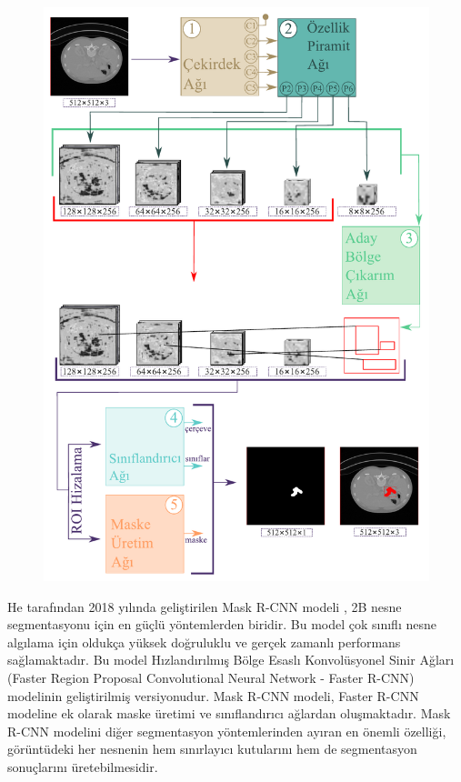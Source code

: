 \begin{figure}[h!]
	\begin{center}
		\vspace{0.4cm}
		{
			\vspace{0.4cm}
			\includegraphics[scale=0.8]{Yapilan-Calismalar/Figures/maskrcnn.pdf}
		}
	\end{center}
\end{figure}

He tarafından 2018 yılında geliştirilen Mask R-CNN modeli \cite{he2017mask}, 2B nesne segmentasyonu için en güçlü yöntemlerden biridir. Bu model çok sınıflı nesne algılama için oldukça yüksek doğruluklu ve gerçek zamanlı performans sağlamaktadır. Bu model Hızlandırılmış Bölge Esaslı Konvolüsyonel Sinir Ağları \cite{ren2015faster} (Faster Region Proposal Convolutional Neural Network - Faster R-CNN) modelinin geliştirilmiş versiyonudur. Mask R-CNN modeli, Faster R-CNN modeline ek olarak maske üretimi ve sınıflandırıcı ağlardan oluşmaktadır. Mask R-CNN modelini diğer segmentasyon yöntemlerinden ayıran en önemli özelliği, görüntüdeki her nesnenin hem sınırlayıcı kutularını hem de segmentasyon sonuçlarını üretebilmesidir. 


